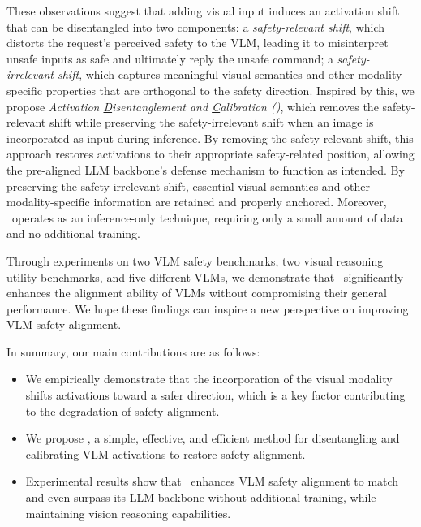 These observations suggest 
that adding visual input induces an activation shift that can be disentangled into two components: a \emph{safety-relevant shift}, which distorts the request's perceived safety to the VLM, leading it to misinterpret unsafe inputs as safe and ultimately reply the unsafe command; a \emph{safety-irrelevant shift}, which captures meaningful visual semantics and other modality-specific properties that are orthogonal to the safety direction. Inspired by this, we propose \emph{Activation \underline{} \underline{D}isentanglement and \underline{C}alibration (\OursMethod)}, which removes the safety-relevant shift while preserving the safety-irrelevant shift when an image is incorporated as input during inference. By removing the safety-relevant shift, this approach restores activations to their appropriate safety-related position, allowing the pre-aligned LLM backbone's defense mechanism to function as intended. By preserving the safety-irrelevant shift, essential visual semantics and other modality-specific information are retained and properly anchored. Moreover, \OursMethod\ operates as an inference-only technique, requiring  only a small amount of data and no additional training. 

Through experiments on two VLM safety benchmarks, two visual reasoning utility benchmarks, and five different VLMs, we demonstrate that \OursMethod\ significantly enhances the alignment ability of VLMs without compromising their general performance. We hope these findings can inspire a new perspective on improving VLM safety alignment. 

In summary, our main contributions are as follows:
\begin{itemize}[leftmargin=*]
\itemsep0em 
    \item We empirically demonstrate that the incorporation of the visual modality shifts activations toward a safer direction, which is a key factor contributing to the degradation of safety alignment.
    \item We propose \OursMethod, a simple, effective, and efficient method for disentangling and calibrating VLM activations to restore safety alignment.
    \item Experimental results show that \OursMethod\ enhances VLM safety alignment to match and even surpass its LLM backbone without additional training, while maintaining vision reasoning capabilities.
\end{itemize}
